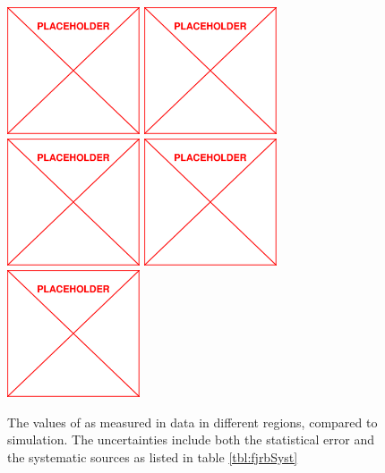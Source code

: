 \begin{figure}
	\centering
	\includegraphics[width=0.35\textwidth]{figs/placeholder}
	\includegraphics[width=0.35\textwidth]{figs/placeholder}
	\includegraphics[width=0.35\textwidth]{figs/placeholder}
	\includegraphics[width=0.35\textwidth]{figs/placeholder}
	\includegraphics[width=0.35\textwidth]{figs/placeholder}
	\caption{The values of \fj as measured in data in different \HT regions, compared to simulation. The uncertainties include both the statistical error and the systematic sources as listed in table \ref{tbl:fjrbSyst}}
	\label{fig:fj}
\end{figure}
